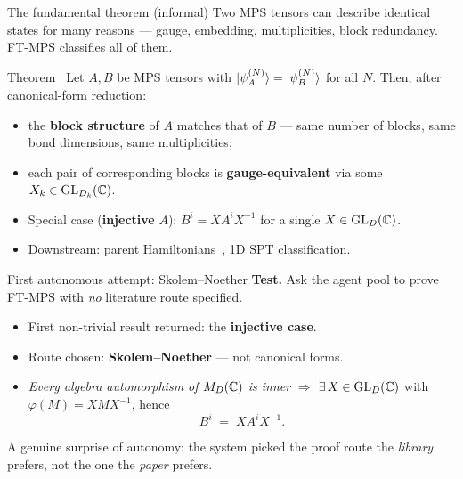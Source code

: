 \documentclass[aspectratio=169,10pt]{beamer}
\begin{document}
\begin{frame}{The fundamental theorem (informal)}
    Two MPS tensors can describe identical states for many reasons --- gauge, embedding, multiplicities, block redundancy. FT-MPS classifies all of them.
    \vspace{0.4em}
    \begin{block}{Theorem~\cite{Perez-Garcia2007Matrix,Cirac2017Annals,Cirac2017Irreducible}}
        Let $A, B$ be MPS tensors with $\ket{\psi_A^{(N)}} = \ket{\psi_B^{(N)}}$ for all $N$. Then, after canonical-form reduction:
        \begin{itemize}
            \item the \textbf{block structure} of $A$ matches that of $B$ --- same number of blocks, same bond dimensions, same multiplicities;
            \item each pair of corresponding blocks is \textbf{gauge-equivalent} via some $X_k \in \mathrm{GL}_{D_k}(\mathbb{C})$.
        \end{itemize}
    \end{block}
    \vspace{0.3em}
    \begin{itemize}
        \item Special case (\textbf{injective} $A$): $B^i = X A^i X^{-1}$ for a single $X \in \mathrm{GL}_D(\mathbb{C})$.
        \item Downstream: parent Hamiltonians~\cite{Fannes1992Finitely}, 1D SPT classification.
    \end{itemize}
\end{frame}

\begin{frame}{First autonomous attempt: Skolem--Noether}
    \textbf{Test.} Ask the agent pool to prove FT-MPS with \emph{no} literature route specified.
    \vspace{0.4em}
    \begin{itemize}
        \item First non-trivial result returned: the \textbf{injective case}.
        \item Route chosen: \textbf{Skolem--Noether} --- not canonical forms.
        \item \emph{Every algebra automorphism of $M_D(\mathbb{C})$ is inner} $\Rightarrow$ $\exists\, X \in \mathrm{GL}_D(\mathbb{C})$ with $\varphi(M) = X M X^{-1}$, hence
            \[ B^i \;=\; X A^i X^{-1}. \]
    \end{itemize}
    \vspace{0.4em}
    \textcolor{dimwhite}{\footnotesize \community{} A genuine surprise of autonomy: the system picked the proof route the \emph{library} prefers, not the one the \emph{paper} prefers.}
\end{frame}
\end{document}
